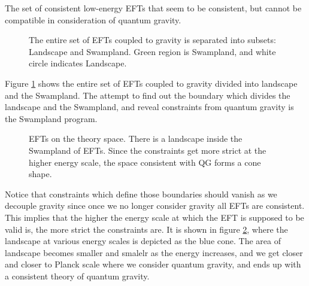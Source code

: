 \begin{tcolorbox}[title=The Swampland,
    title filled=false,
    colback=blue!5!white,
    colframe=blue!75!black]
    The set of consistent low-energy EFTs that seem to be consistent, but cannot be compatible in consideration of quantum gravity. 
\end{tcolorbox} 
\begin{figure}
    \centering
    \caption{The entire set of EFTs coupled to gravity is separated into subsets: Landscape and Swampland. Green region is Swampland, and white circle indicates Landscape.}
    \label{fig:set}
\end{figure}
Figure \ref{fig:set} shows the entire set of EFTs coupled to gravity divided into landscape and the Swampland. The attempt to find out the boundary which divides the landscape and the Swampland, and reveal constraints from quantum gravity is the Swampland program.
 

\begin{figure}[h]
\caption{EFTs on the theory space. There is a landscape inside the Swampland of EFTs. Since the constraints get more strict at the higher energy scale, the space consistent with QG forms a cone shape.}
\label{fig:swampland}
\end{figure}
Notice that constraints which define those boundaries should vanish as we decouple gravity since once we no longer consider gravity all EFTs are consistent. This implies that the higher the energy scale at which the EFT is supposed to be valid is, the more strict the constraints are. It is shown in figure \ref{fig:swampland}, where the landscape at various energy scales is depicted as the blue cone. The area of landscape becomes smaller and smalelr as the energy increases, and we get closer and closer to Planck scale where we consider quantum gravity, and ends up with a consistent theory of quantum gravity. \\

